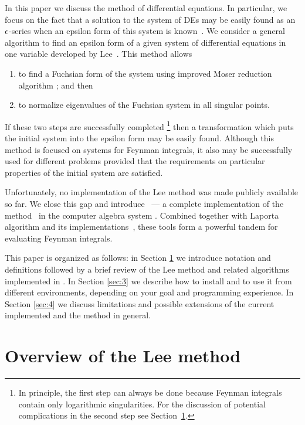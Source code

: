 \documentclass[12pt,a4paper]{article}
\begin{document}
In this paper we discuss the method of differential equations.
In particular, we focus on the fact that a solution to the system of DEs may be easily found as an $\epsilon$-series when an epsilon form of this system is known~\cite{Henn13}.
We consider a general algorithm to find an epsilon form of a given system of differential equations in one variable developed by Lee~\cite{Lee15}.
This method allows
\begin{enumerate}
  \item to find a Fuchsian form of the system using improved Moser reduction algorithm \cite{Mos59}; and then
  \item to normalize eigenvalues of the Fuchsian system in all singular points.
\end{enumerate}
If these two steps are successfully completed%
\footnote{In principle, the first step can always be done because Feynman integrals contain only logarithmic singularities. For the discussion of potential complications in the second step see Section~\ref{sec:2}.}
then a transformation which puts the initial system into the epsilon form may be easily found.
Although this method is focused on systems for Feynman integrals, it also may be successfully used for different problems provided that the requirements on particular properties of the initial system are satisfied.

Unfortunately, no implementation of the Lee method was made publicly available so far.
We close this gap and introduce \fuchsia \ --- a complete implementation of the method~\cite{Lee15} in the computer algebra system \sage.
Combined together with Laporta algorithm \cite{Lap00} and its implementations~\cite{Smi08,MS12,Lee12,Lee13,SS13,Smi14}, these tools form a powerful tandem for evaluating Feynman integrals.

This paper is organized as follows: in Section \ref{sec:2} we introduce notation and definitions followed by a brief review of the Lee method and related algorithms implemented in \fuchsia.
In Section \ref{sec:3} we describe how to install \fuchsia and to use it from different environments, depending on your goal and programming experience.
In Section \ref{sec:4} we discuss limitations and possible extensions of the current implemented and the method in general.


\section{Overview of the Lee method}
\label{sec:2}
\end{document}
